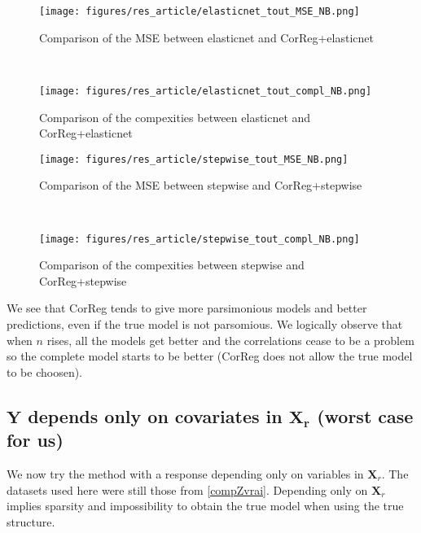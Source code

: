 \documentclass[12pt,a4paper]{report}
\begin{document}
 \begin{figure}[h!]
	\begin{minipage}[l]{.48\linewidth}
			\texttt{[image: figures/res\_article/elasticnet\_tout\_MSE\_NB.png]} 
			\caption{Comparison of the MSE between elasticnet and CorReg+elasticnet}
	\end{minipage} \
   \begin{minipage}[r]{.48\linewidth}
			\texttt{[image: figures/res\_article/elasticnet\_tout\_compl\_NB.png]} 
			\caption{Comparison of the compexities between elasticnet and CorReg+elasticnet} 
   \end{minipage}
\end{figure}

 \begin{figure}[h!]
	\begin{minipage}[l]{.48\linewidth}
			\texttt{[image: figures/res\_article/stepwise\_tout\_MSE\_NB.png]} 
			\caption{Comparison of the MSE between stepwise and CorReg+stepwise}
	\end{minipage} \
   \begin{minipage}[r]{.48\linewidth}
			\texttt{[image: figures/res\_article/stepwise\_tout\_compl\_NB.png]} 
			\caption{Comparison of the compexities between stepwise and CorReg+stepwise} 
   \end{minipage}
\end{figure}

We see that CorReg tends to give more parsimonious models and better predictions, even if the true model is not parsomious. We logically observe that when $n$ rises, all the models get better and the correlations cease to be a problem so the complete model starts to be better (CorReg does not allow the true model to be choosen).




\clearpage
	\subsection{$\boldsymbol{Y}$ depends only on covariates in $\boldsymbol{X_r}$ (worst case for us)}	 \label{tableMSEsimgauche}
We now try the method with a response depending only on variables in $\boldsymbol{X}_r$. The datasets used here were still those from \ref{compZvrai}.
Depending only on $\boldsymbol{X}_r$ implies sparsity and impossibility to obtain the true model when using the true structure. 
\end{document}
